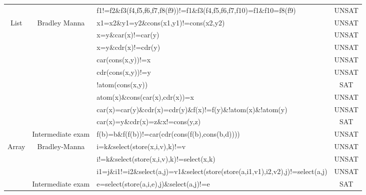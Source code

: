 \documentclass{IEEEtran}
\begin{document}
\begin{table}[htpb]
{\begin{tabular}{@{}cclc@{}}
			&                   & f1!=f2\&f3(f4,f5,f6,f7,f8(f9))!=f1\&f3(f4,f5,f6,f7,f10)=f1\&f10=f8(f9)                                     & UNSAT           \\
			List            & Bradley Manna     & x1=x2\&y1=y2\&cons(x1,y1)!=cons(x2,y2)                                                                     & UNSAT           \\
			&                   & x=y\&car(x)!=car(y)                                                                                        & UNSAT           \\
			&                   & x=y\&cdr(x)!=cdr(y)                                                                                        & UNSAT           \\
			&                   & car(cons(x,y))!=x                                                                                          & UNSAT           \\
			&                   & cdr(cons(x,y))!=y                                                                                          & UNSAT           \\
			&                   & !atom(cons(x,y))                                                                                           & SAT             \\
			&                   & atom(x)\&cons(car(x),cdr(x))=x                                                                             & UNSAT           \\
			&                   & car(x)=car(y)\&cdr(x)=cdr(y)\&f(x)!=f(y)\&!atom(x)\&!atom(y)                                               & UNSAT           \\
			&                   & car(x)=y\&cdr(x)=z\&x!=cons(y,z)                                                                           & SAT             \\
			& Intermediate exam & f(b)=b\&f(f(b))!=car(cdr(cons(f(b),cons(b,d))))                                                            & UNSAT           \\
			Array           & Bradley-Manna     & i=k\&select(store(x,i,v),k)!=v                                                                             & UNSAT           \\
			&                   & i!=k\&select(store(x,i,v),k)!=select(x,k)                                                                  & UNSAT           \\
			&                   & i1=j\&i1!=i2\&select(a,j)=v1\&select(store(store(a,i1,v1),i2,v2),j)!=select(a,j)                           & UNSAT           \\
			& Intermediate exam & e=select(store(a,i,e),j)\&select(a,j)!=e                                                                   & SAT             \\ \bottomrule
		\end{tabular}%
	}
\end{table}
\end{document}
